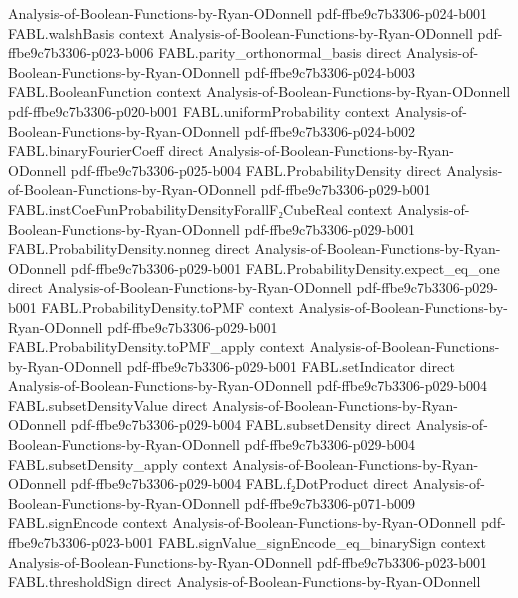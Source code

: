 \begin{theorem}
  {Analysis-of-Boolean-Functions-by-Ryan-ODonnell}
  {pdf-ffbe9c7b3306-p024-b001}
\proofstep
  {FABL.walshBasis}
  {context}
  {Analysis-of-Boolean-Functions-by-Ryan-ODonnell}
  {pdf-ffbe9c7b3306-p023-b006}
\proofstep
  {FABL.parity_orthonormal_basis}
  {direct}
  {Analysis-of-Boolean-Functions-by-Ryan-ODonnell}
  {pdf-ffbe9c7b3306-p024-b003}
\proofstep
  {FABL.BooleanFunction}
  {context}
  {Analysis-of-Boolean-Functions-by-Ryan-ODonnell}
  {pdf-ffbe9c7b3306-p020-b001}
\proofstep
  {FABL.uniformProbability}
  {context}
  {Analysis-of-Boolean-Functions-by-Ryan-ODonnell}
  {pdf-ffbe9c7b3306-p024-b002}
\proofstep
  {FABL.binaryFourierCoeff}
  {direct}
  {Analysis-of-Boolean-Functions-by-Ryan-ODonnell}
  {pdf-ffbe9c7b3306-p025-b004}
\proofstep
  {FABL.ProbabilityDensity}
  {direct}
  {Analysis-of-Boolean-Functions-by-Ryan-ODonnell}
  {pdf-ffbe9c7b3306-p029-b001}
\proofstep
  {FABL.instCoeFunProbabilityDensityForallF₂CubeReal}
  {context}
  {Analysis-of-Boolean-Functions-by-Ryan-ODonnell}
  {pdf-ffbe9c7b3306-p029-b001}
\proofstep
  {FABL.ProbabilityDensity.nonneg}
  {direct}
  {Analysis-of-Boolean-Functions-by-Ryan-ODonnell}
  {pdf-ffbe9c7b3306-p029-b001}
\proofstep
  {FABL.ProbabilityDensity.expect_eq_one}
  {direct}
  {Analysis-of-Boolean-Functions-by-Ryan-ODonnell}
  {pdf-ffbe9c7b3306-p029-b001}
\proofstep
  {FABL.ProbabilityDensity.toPMF}
  {context}
  {Analysis-of-Boolean-Functions-by-Ryan-ODonnell}
  {pdf-ffbe9c7b3306-p029-b001}
\proofstep
  {FABL.ProbabilityDensity.toPMF_apply}
  {context}
  {Analysis-of-Boolean-Functions-by-Ryan-ODonnell}
  {pdf-ffbe9c7b3306-p029-b001}
\proofstep
  {FABL.setIndicator}
  {direct}
  {Analysis-of-Boolean-Functions-by-Ryan-ODonnell}
  {pdf-ffbe9c7b3306-p029-b004}
\proofstep
  {FABL.subsetDensityValue}
  {direct}
  {Analysis-of-Boolean-Functions-by-Ryan-ODonnell}
  {pdf-ffbe9c7b3306-p029-b004}
\proofstep
  {FABL.subsetDensity}
  {direct}
  {Analysis-of-Boolean-Functions-by-Ryan-ODonnell}
  {pdf-ffbe9c7b3306-p029-b004}
\proofstep
  {FABL.subsetDensity_apply}
  {context}
  {Analysis-of-Boolean-Functions-by-Ryan-ODonnell}
  {pdf-ffbe9c7b3306-p029-b004}
\proofstep
  {FABL.f₂DotProduct}
  {direct}
  {Analysis-of-Boolean-Functions-by-Ryan-ODonnell}
  {pdf-ffbe9c7b3306-p071-b009}
\proofstep
  {FABL.signEncode}
  {context}
  {Analysis-of-Boolean-Functions-by-Ryan-ODonnell}
  {pdf-ffbe9c7b3306-p023-b001}
\proofstep
  {FABL.signValue_signEncode_eq_binarySign}
  {context}
  {Analysis-of-Boolean-Functions-by-Ryan-ODonnell}
  {pdf-ffbe9c7b3306-p023-b001}
\proofstep
  {FABL.thresholdSign}
  {direct}
  {Analysis-of-Boolean-Functions-by-Ryan-ODonnell}

\end{theorem}
